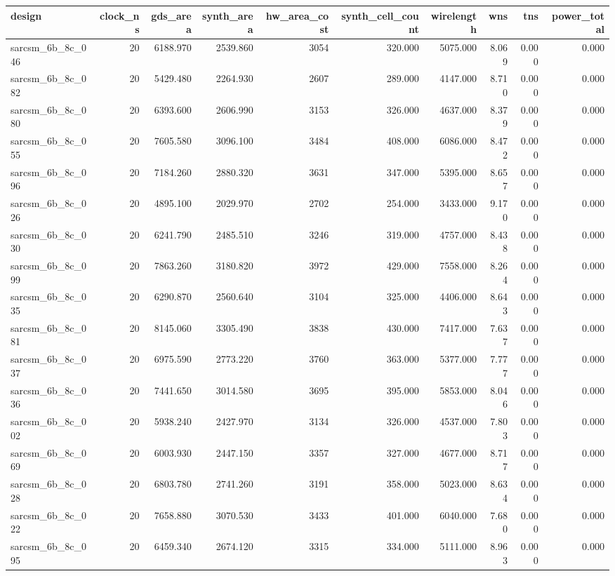 \begin{tabular}{lrrrrrrrrr}
\toprule
design & clock\_ns & gds\_area & synth\_area & hw\_area\_cost & synth\_cell\_count & wirelength & wns & tns & power\_total \\
\midrule
sarcsm\_6b\_8c\_046 & 20 & 6188.970 & 2539.860 & 3054 & 320.000 & 5075.000 & 8.069 & 0.000 & 0.000 \\
sarcsm\_6b\_8c\_082 & 20 & 5429.480 & 2264.930 & 2607 & 289.000 & 4147.000 & 8.710 & 0.000 & 0.000 \\
sarcsm\_6b\_8c\_080 & 20 & 6393.600 & 2606.990 & 3153 & 326.000 & 4637.000 & 8.379 & 0.000 & 0.000 \\
sarcsm\_6b\_8c\_055 & 20 & 7605.580 & 3096.100 & 3484 & 408.000 & 6086.000 & 8.472 & 0.000 & 0.000 \\
sarcsm\_6b\_8c\_096 & 20 & 7184.260 & 2880.320 & 3631 & 347.000 & 5395.000 & 8.657 & 0.000 & 0.000 \\
sarcsm\_6b\_8c\_026 & 20 & 4895.100 & 2029.970 & 2702 & 254.000 & 3433.000 & 9.170 & 0.000 & 0.000 \\
sarcsm\_6b\_8c\_030 & 20 & 6241.790 & 2485.510 & 3246 & 319.000 & 4757.000 & 8.438 & 0.000 & 0.000 \\
sarcsm\_6b\_8c\_099 & 20 & 7863.260 & 3180.820 & 3972 & 429.000 & 7558.000 & 8.264 & 0.000 & 0.000 \\
sarcsm\_6b\_8c\_035 & 20 & 6290.870 & 2560.640 & 3104 & 325.000 & 4406.000 & 8.643 & 0.000 & 0.000 \\
sarcsm\_6b\_8c\_081 & 20 & 8145.060 & 3305.490 & 3838 & 430.000 & 7417.000 & 7.637 & 0.000 & 0.000 \\
sarcsm\_6b\_8c\_037 & 20 & 6975.590 & 2773.220 & 3760 & 363.000 & 5377.000 & 7.777 & 0.000 & 0.000 \\
sarcsm\_6b\_8c\_036 & 20 & 7441.650 & 3014.580 & 3695 & 395.000 & 5853.000 & 8.046 & 0.000 & 0.000 \\
sarcsm\_6b\_8c\_002 & 20 & 5938.240 & 2427.970 & 3134 & 326.000 & 4537.000 & 7.803 & 0.000 & 0.000 \\
sarcsm\_6b\_8c\_069 & 20 & 6003.930 & 2447.150 & 3357 & 327.000 & 4677.000 & 8.717 & 0.000 & 0.000 \\
sarcsm\_6b\_8c\_028 & 20 & 6803.780 & 2741.260 & 3191 & 358.000 & 5023.000 & 8.634 & 0.000 & 0.000 \\
sarcsm\_6b\_8c\_022 & 20 & 7658.880 & 3070.530 & 3433 & 401.000 & 6040.000 & 7.680 & 0.000 & 0.000 \\
sarcsm\_6b\_8c\_095 & 20 & 6459.340 & 2674.120 & 3315 & 334.000 & 5111.000 & 8.963 & 0.000 & 0.000 \\

\end{tabular}
